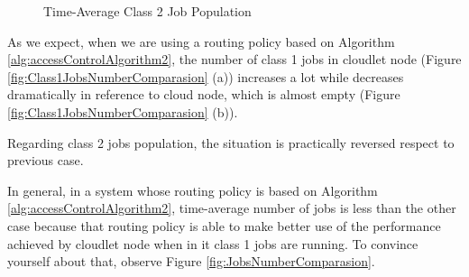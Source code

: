 \documentclass[10pt,a4paper]{article}
\begin{document}
\begin{figure}[h!]
    \centering
    \caption{Time-Average Class 2 Job Population}%
    \label{fig:Class2JobsNumberComparasion}
\end{figure}

As we expect, when we are using a routing policy based on Algorithm \ref{alg:accessControlAlgorithm2}, the number of class 1 jobs in cloudlet node (Figure \ref{fig:Class1JobsNumberComparasion} (a)) increases a lot while decreases dramatically in reference to cloud node, which is almost empty (Figure \ref{fig:Class1JobsNumberComparasion} (b)).

Regarding class 2 jobs population, the situation is practically reversed respect to previous case.

In general, in a system whose routing policy is based on Algorithm \ref{alg:accessControlAlgorithm2}, time-average number of jobs is less than the other case because that routing policy is able to make better use of the performance achieved by cloudlet node when in it class 1 jobs are running. To convince yourself about that, observe Figure \ref{fig:JobsNumberComparasion}.
\end{document}
